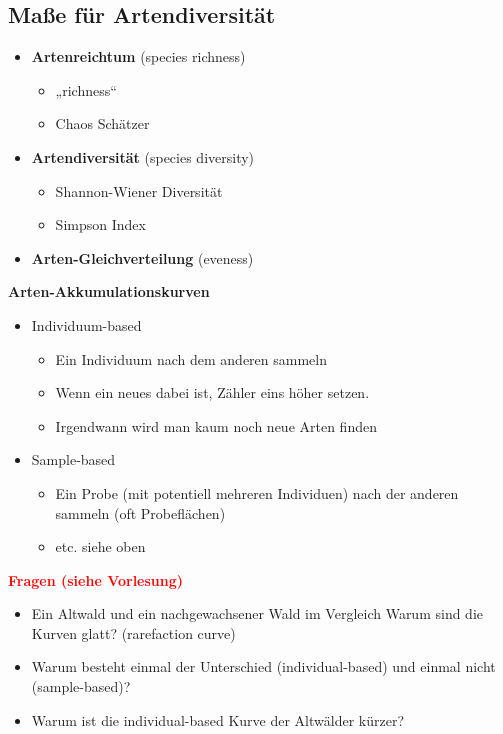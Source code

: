 \subsection{Maße für Artendiversität}
\begin{itemize}
	\item \textbf{Artenreichtum} (species richness)
	\begin{itemize}
		\item „richness“
		\item Chaos Schätzer
	\end{itemize}
	\item \textbf{Artendiversität} (species diversity)
	\begin{itemize}
		\item Shannon-Wiener Diversität
		\item Simpson Index
	\end{itemize}
	\item \textbf{Arten-Gleichverteilung} (eveness)
\end{itemize}

\newpage
\textbf{Arten-Akkumulationskurven}
\begin{itemize}
	\item Individuum-based
	\begin{itemize}
		\item Ein Individuum nach dem anderen sammeln
		\item Wenn ein neues dabei ist, Zähler eins höher setzen.
		\item Irgendwann wird man kaum noch neue Arten finden
	\end{itemize}
	\item Sample-based
	\begin{itemize}
		\item Ein Probe (mit potentiell mehreren Individuen) nach der anderen sammeln (oft Probeflächen)
		\item etc. siehe oben
	\end{itemize}
\end{itemize}

\textbf{\textcolor{red}{Fragen (siehe Vorlesung)}}
\begin{itemize}
	\item Ein Altwald und ein nachgewachsener Wald im Vergleich Warum sind die Kurven glatt? (rarefaction curve)
	\item Warum besteht einmal der Unterschied (individual-based) und einmal nicht (sample-based)?
	\item Warum ist die individual-based Kurve der Altwälder kürzer?
\end{itemize}